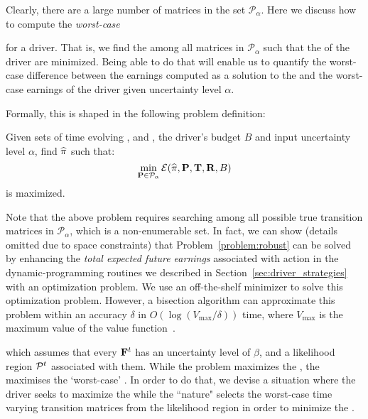 Clearly, there are a large number of matrices in the set $\mathcal{P}_\alpha$.
Here we discuss how to compute the \emph{worst-case}{ {\totalexpectedearnings} for a driver. That is, we find the {\truetransitionmatrix} among all matrices in $\mathcal{P}_\alpha$ such that the {\totalexpectedearnings} of the driver
are minimized. Being able to do that will enable us to 
quantify the worst-case difference between the earnings computed
as a solution to the {\originalproblem} and the worst-case earnings of the
driver given uncertainty level $\alpha$.


Formally, this is shaped in the following problem definition:

\begin{problem}[{\robustproblem}]\label{problem:robust}
Given sets of time evolving {\countmatrix}, {\traveltimematrix} and {\rewardsmatrix}, the driver's budget $B$ and input uncertainty level $\alpha$,
find $\widehat{\pi}$
such that:
\[
\min_{{\mathbf{P}}\in\mathcal{P}_\alpha}\mathcal{E}(\widehat{\pi},{\mathbf{P}},{\mathbf{T}},{\mathbf{R}},B)
\]
is maximized.
\end{problem}
Note that the above problem requires searching among all possible true transition 
matrices in $\mathcal{P}_\alpha$, which is a non-enumerable set. 
In fact, we can show (details omitted due to space constraints) that 
Problem~\ref{problem:robust} can be solved by enhancing the \emph{total expected future earnings} associated with {\getpassenger} action in the  dynamic-programming routines we described in Section~\ref{sec:driver_strategies}
with an optimization problem. We use an off-the-shelf minimizer to solve this optimization problem. However, a bisection algorithm can approximate this problem within an accuracy $\delta$ in $O(\log(V_{\max}/\delta))$ time, where $V_{\max}$ is the maximum value of the value function~\cite{nilim2004robustness}.

\iffalse
which assumes that every ${{\mathbf{F}}}^t$ has an uncertainty level of $\beta$, and a likelihood region $\mathcal{P}^t$ associated with them. While the {\originalproblem} problem maximizes the {\totalexpectedearnings}, the {\nominalproblem} maximises the `worst-case' {\totalexpectedearnings}. In order to do that, we devise a situation where the driver seeks to maximize the {\totalexpectedearnings} 
while the ``nature" selects the worst-case time varying transition matrices from the likelihood region {\likelihoodregion} in order to minimize the {\totalexpectedearnings}.

}

